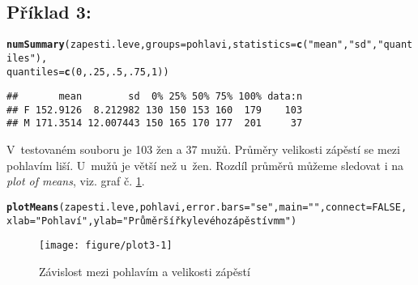 \documentclass[twoside]{article}\usepackage[]{graphicx}\usepackage[]{color}
\makeatletter
\def\maxwidth{ %
  \ifdim\Gin@nat@width>\linewidth
    \linewidth
  \else
    \Gin@nat@width
  \fi
}
\newcommand{\hlnum}[1]{\textcolor[rgb]{0.686,0.059,0.569}{#1}}%
\newcommand{\hlstr}[1]{\textcolor[rgb]{0.192,0.494,0.8}{#1}}%
\newcommand{\hlstd}[1]{\textcolor[rgb]{0.345,0.345,0.345}{#1}}%
\newcommand{\hlkwc}[1]{\textcolor[rgb]{0.333,0.667,0.333}{#1}}%
\newcommand{\hlkwd}[1]{\textcolor[rgb]{0.737,0.353,0.396}{\textbf{#1}}}%
\newenvironment{kframe}{%
 \def\at@end@of@kframe{}%
 \ifinner\ifhmode%
  \def\at@end@of@kframe{\end{minipage}}%
  \begin{minipage}{\columnwidth}%
 \fi\fi%
 \def\FrameCommand##1{\hskip\@totalleftmargin \hskip-\fboxsep
 \colorbox{shadecolor}{##1}\hskip-\fboxsep
     \hskip-\linewidth \hskip-\@totalleftmargin \hskip\columnwidth}%
 \MakeFramed {\advance\hsize-\width
   \@totalleftmargin\z@ \linewidth\hsize
   \@setminipage}}%
 {\par\unskip\endMakeFramed%
 \at@end@of@kframe}
\newenvironment{knitrout}{}{} %
\makeatother
\begin{document}
\subsection*{Příklad 3:}
\begin{knitrout}
\color{fgcolor}\begin{kframe}
\begin{alltt}
\hlkwd{numSummary}\hlstd{(zapesti.leve,} \hlkwc{groups}\hlstd{=pohlavi,} \hlkwc{statistics}\hlstd{=}\hlkwd{c}\hlstd{(}\hlstr{"mean"}\hlstd{,} \hlstr{"sd"}\hlstd{,} \hlstr{"quantiles"}\hlstd{),}
    \hlkwc{quantiles}\hlstd{=}\hlkwd{c}\hlstd{(}\hlnum{0}\hlstd{,}\hlnum{.25}\hlstd{,}\hlnum{.5}\hlstd{,}\hlnum{.75}\hlstd{,}\hlnum{1}\hlstd{))}
\end{alltt}
\begin{verbatim}
##       mean        sd  0% 25% 50% 75% 100% data:n
## F 152.9126  8.212982 130 150 153 160  179    103
## M 171.3514 12.007443 150 165 170 177  201     37
\end{verbatim}
\end{kframe}
\end{knitrout}
V~testovaném souboru je 103 žen a 37 mužů. Průměry velikosti zápěstí se mezi pohlavím liší. U~mužů je větší než u~žen. Rozdíl průměrů můžeme sledovat i na \emph{plot of means}, viz. graf č. \ref{fig:plot3}.

\begin{knitrout}
\color{fgcolor}\begin{kframe}
\begin{alltt}
\hlkwd{plotMeans}\hlstd{(zapesti.leve, pohlavi,} \hlkwc{error.bars}\hlstd{=}\hlstr{"se"}\hlstd{,} \hlkwc{main}\hlstd{=}\hlstr{""}\hlstd{,} \hlkwc{connect}\hlstd{=}\hlnum{FALSE}\hlstd{,}
    \hlkwc{xlab}\hlstd{=}\hlstr{"Pohlaví"}\hlstd{,} \hlkwc{ylab}\hlstd{=}\hlstr{"Průměr šířky levého zápěstí v mm"}\hlstd{)}
\end{alltt}
\end{kframe}\begin{figure}[h]
\texttt{[image: figure/plot3-1]} \caption[Závislost mezi pohlavím a velikosti zápěstí]{Závislost mezi pohlavím a velikosti zápěstí}\label{fig:plot3}
\end{figure}


\end{knitrout}

\newpage
\end{document}

